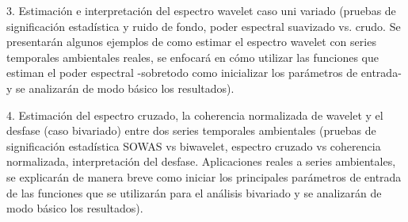 \begin{itemize}
3. Estimación e interpretación del espectro wavelet caso uni variado (pruebas de significación estadística y ruido de fondo, poder espectral suavizado vs. crudo. Se presentarán algunos ejemplos de como estimar el espectro wavelet con series temporales ambientales reales, se enfocará en cómo utilizar las funciones que estiman el poder espectral -sobretodo como inicializar los parámetros de entrada-  y se analizarán de modo básico los resultados). 

4. Estimación del espectro cruzado, la coherencia normalizada de wavelet y el desfase (caso bivariado) entre dos series temporales ambientales (pruebas de significación estadística SOWAS vs biwavelet, espectro cruzado vs coherencia normalizada, interpretación del desfase. Aplicaciones reales a series ambientales, se explicarán de manera breve como iniciar los principales parámetros de entrada de las funciones que se utilizarán para el análisis bivariado y se analizarán de modo básico los resultados).\end{itemize}

%

%
